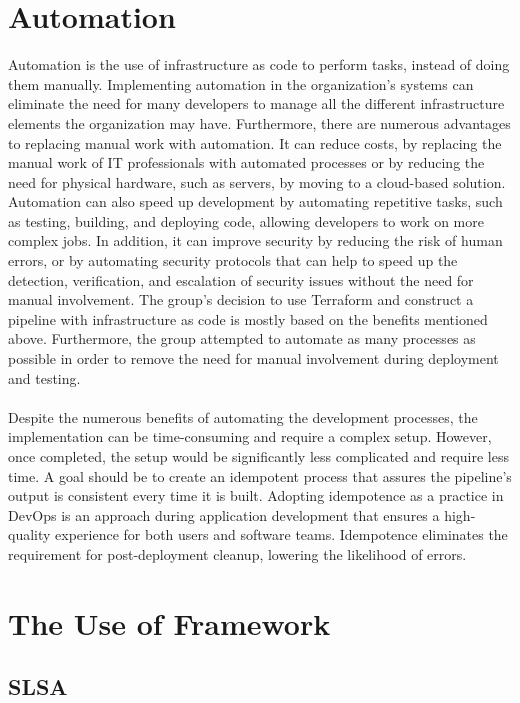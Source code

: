 \section{Automation}
Automation is the use of \gls{infrastructure as code} to perform tasks, instead of doing them manually. Implementing automation in the organization's systems can eliminate the need for many developers to manage all the different infrastructure elements the organization may have. Furthermore, there are numerous advantages to replacing manual work with automation. It can reduce costs, by replacing the manual work of IT professionals with automated processes or by reducing the need for physical hardware, such as servers, by moving to a cloud-based solution. Automation can also speed up development by automating repetitive tasks, such as testing, building, and deploying code, allowing developers to work on more complex jobs. In addition, it can improve security by reducing the risk of human errors, or by automating security protocols that can help to speed up the detection, verification, and escalation of security issues without the need for manual involvement. The group's decision to use Terraform and construct a pipeline with \gls{infrastructure as code} is mostly based on the benefits mentioned above. Furthermore, the group attempted to automate as many processes as possible in order to remove the need for manual involvement during deployment and testing. \cite{automation} \cite{automationredhat}
\\~\\
Despite the numerous benefits of automating the development processes, the implementation can be time-consuming and require a complex setup. However, once completed, the setup would be significantly less complicated and require less time. A goal should be to create an \gls{idempotent} process that assures the pipeline's output is consistent every time it is built. Adopting idempotence as a practice in DevOps is an approach during application development that ensures a high-quality experience for both users and software teams. Idempotence eliminates the requirement for post-deployment cleanup, lowering the likelihood of errors. \cite{idempotent}

\section{The Use of Framework}
\subsection{SLSA}

